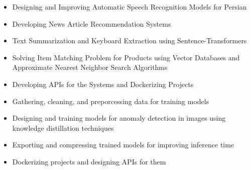 \documentclass[10pt,a4paper]{altacv}
\begin{document}
\begin{paracol}{2}




	\begin{itemize}
		\justifying
		\item \small{Designing and Improving Automatic Speech Recognition Models for Persian}
		\item\small{Developing News Article Recommendation Systems}
		\item\small{Text Summarization and Keyboard Extraction using Sentence-Transformers}
		\item\small{Solving Item Matching Problem for Products using Vector Databases and Approximate Nearest Neighbor Search Algorithms}
		\item\small{Developing APIs for the Systems and Dockerizing Projects}
	\end{itemize}
\divider

\begin{itemize}
	\justifying
\item \small{Gathering, cleaning, and preporcessing data for  training models}
\item\small{Designing and training models for anomaly detection in images using knowledge distillation techniques}
\item\small{Exporting and compressing trained models for improving inference time}
\item\small{Dockerizing projects and designing APIs for them}
\end{itemize}


\end{paracol}
\end{document}
